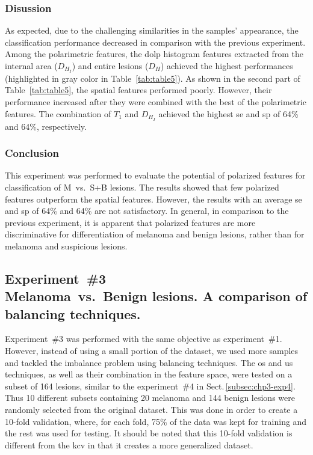 \subsubsection{Disussion}
As expected, due to the challenging similarities in the samples' appearance, the classification performance decreased in comparison with the previous experiment.
Among the polarimetric features, the \ac{dolp} histogram features extracted from the internal area ($D_{H_{I}}$) and entire lesions ($D_{H}$) achieved the highest performances (highlighted in gray color in Table~\ref{tab:table5}).
As shown in the second part of Table~\ref{tab:table5}, the spatial features performed poorly.
However, their performance increased after they were combined with the best of the polarimetric features.
The combination of $T_{1}$ and $D_{H_{I}}$ achieved the highest \ac{se} and \ac{sp} of 64\% and 64\%, respectively.

\subsubsection{Conclusion}
This experiment was performed to evaluate the potential of polarized features for classification of M~vs.~S+B lesions.
The results showed that few polarized features outperform the spatial features.
However, the results with an average \ac{se} and \ac{sp} of 64\% and 64\% are not satisfactory.
In general, in comparison to the previous experiment, it is apparent that polarized features are more discriminative for differentiation of melanoma and benign lesions, rather than for melanoma and suspicious lesions. 

\subsection{Experiment~\#3\\
\small{Melanoma~vs.~Benign lesions. A comparison of balancing techniques.}}
Experiment~\#3 was performed with the same objective as experiment~\#1.
However, instead of using a small portion of the dataset, we used more samples and tackled the imbalance problem using balancing techniques.
The \acl{os} and \ac{us} techniques, as well as their combination in the feature space, were tested on a subset of 164 lesions, similar to the experiment~\#4 in Sect.\,\ref{subsec:chp3-exp4}.
Thus 10 different subsets containing 20 melanoma and 144 benign lesions were randomly selected from the original dataset.
This was done in order to create a 10-fold validation, where, for each fold, 75\% of the data was kept for training and the rest was used for testing.
It should be noted that this 10-fold validation is different from the \ac{kcv} in that it creates a more generalized dataset. 

